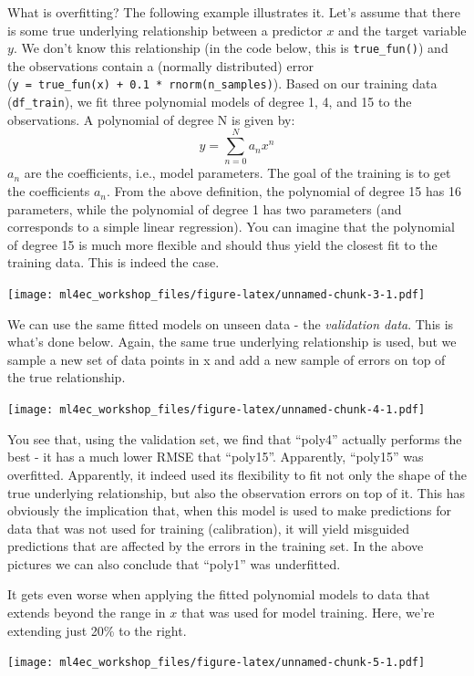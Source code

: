 \documentclass[
]{book}
\begin{document}
What is overfitting? The following example illustrates it. Let's assume that there is some true underlying relationship between a predictor \(x\) and the target variable \(y\). We don't know this relationship (in the code below, this is \texttt{true\_fun()}) and the observations contain a (normally distributed) error (\texttt{y\ =\ true\_fun(x)\ +\ 0.1\ *\ rnorm(n\_samples)}). Based on our training data (\texttt{df\_train}), we fit three polynomial models of degree 1, 4, and 15 to the observations. A polynomial of degree N is given by: \[
y = \sum_{n=0}^N a_n x^n
\] \(a_n\) are the coefficients, i.e., model parameters. The goal of the training is to get the coefficients \(a_n\). From the above definition, the polynomial of degree 15 has 16 parameters, while the polynomial of degree 1 has two parameters (and corresponds to a simple linear regression). You can imagine that the polynomial of degree 15 is much more flexible and should thus yield the closest fit to the training data. This is indeed the case.

\texttt{[image: ml4ec\_workshop\_files/figure-latex/unnamed-chunk-3-1.pdf]}

We can use the same fitted models on unseen data - the \emph{validation data}. This is what's done below. Again, the same true underlying relationship is used, but we sample a new set of data points in x and add a new sample of errors on top of the true relationship.

\texttt{[image: ml4ec\_workshop\_files/figure-latex/unnamed-chunk-4-1.pdf]}

You see that, using the validation set, we find that ``poly4'' actually performs the best - it has a much lower RMSE that ``poly15''. Apparently, ``poly15'' was overfitted. Apparently, it indeed used its flexibility to fit not only the shape of the true underlying relationship, but also the observation errors on top of it. This has obviously the implication that, when this model is used to make predictions for data that was not used for training (calibration), it will yield misguided predictions that are affected by the errors in the training set. In the above pictures we can also conclude that ``poly1'' was underfitted.

It gets even worse when applying the fitted polynomial models to data that extends beyond the range in \(x\) that was used for model training. Here, we're extending just 20\% to the right.

\texttt{[image: ml4ec\_workshop\_files/figure-latex/unnamed-chunk-5-1.pdf]}
\end{document}
